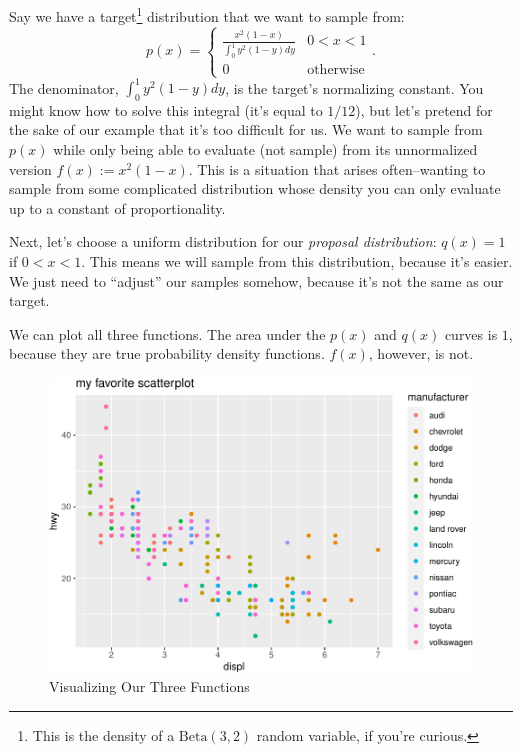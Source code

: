 \documentclass[
  12pt,
  krantz2]{krantz}
\begin{document}
Say we have a target\footnote{This is the density of a \(\text{Beta}(3,2)\) random variable, if you're curious.} distribution that we want to sample from:
\begin{equation} 
p(x) = 
\begin{cases}
\frac{x^2(1-x)}{\int_0^1 y^2(1-y) dy} & 0 < x < 1 \\
0 & \text{otherwise}
\end{cases}.
\end{equation}
The denominator, \(\int_0^1 y^2(1-y) dy\), is the target's normalizing constant. You might know how to solve this integral (it's equal to \(1/12\)), but let's pretend for the sake of our example that it's too difficult for us. We want to sample from \(p(x)\) while only being able to evaluate (not sample) from its unnormalized version \(f(x) := x^2(1-x)\). This is a situation that arises often--wanting to sample from some complicated distribution whose density you can only evaluate up to a constant of proportionality.

Next, let's choose a uniform distribution for our \emph{proposal distribution}: \(q(x) = 1\) if \(0 < x < 1\). This means we will sample from this distribution, because it's easier. We just need to ``adjust'' our samples somehow, because it's not the same as our target.

We can plot all three functions. The area under the \(p(x)\) and \(q(x)\) curves is \(1\), because they are true probability density functions. \(f(x)\), however, is not.

\begin{figure}

{\centering \includegraphics[width=0.8\linewidth]{r_and_python_book_files/figure-latex/unnamed-chunk-186-1} 

}

\caption{Visualizing Our Three Functions}\label{fig:unnamed-chunk-186}
\end{figure}
\end{document}
